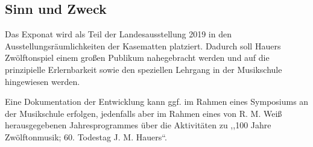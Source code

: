 \documentclass[a4paper]{scrartcl}
\begin{document}
\subsection{Sinn und Zweck}
Das Exponat wird als Teil der Landesausstellung 2019 in den Ausstellungsräumlichkeiten der Kasematten platziert. Dadurch soll Hauers Zwölftonspiel einem großen Publikum nahegebracht werden und auf die prinzipielle Erlernbarkeit sowie den speziellen Lehrgang in der Musikschule hingewiesen werden.

\noindent
Eine Dokumentation der Entwicklung kann ggf. im Rahmen eines Symposiums an der Musikschule erfolgen, jedenfalls aber im Rahmen eines von R. M. Weiß herausgegebenen Jahresprogrammes über die Aktivitäten zu ,,100 Jahre Zwölftonmusik; 60. Todestag J. M. Hauers``.

\end{document}
